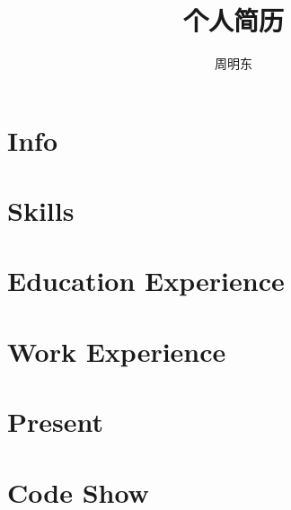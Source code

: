 \documentclass[a4paper]{book}
\title{个人简历}
\author{周明东}
\begin{document}
	\frontmatter
	\maketitle
	\tableofcontents

	\mainmatter
	\section{Info}
		
	\section{Skills}
		
	\section{Education Experience}
		
	\section{Work Experience}
		
	\section{Present}
		
	\section{Code Show}
		
			
			
		
			
\end{document}
